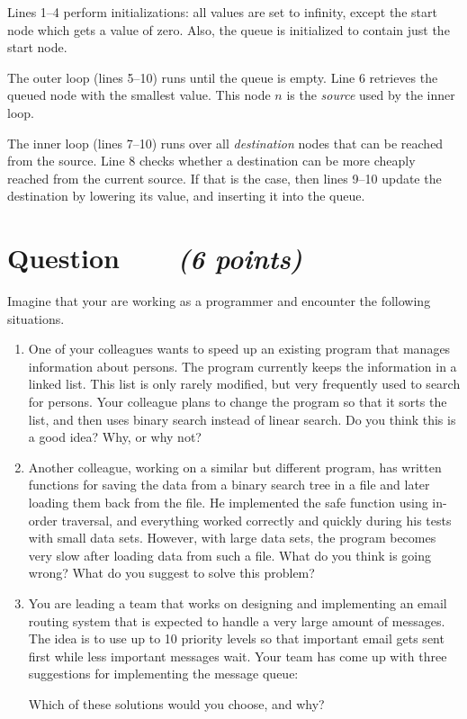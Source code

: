 \documentclass[a4paper]{article}
\newcounter{question}
\newcommand{\question}[1]{\refstepcounter{question}\section*{Question~\thequestion~~~\small\emph{(#1)}}}
\renewcommand*\thequestion{\arabic{question}}
\begin{document}
Lines 1--4 perform initializations: all values are set to infinity, except the start node which gets a value of zero.
Also, the queue is initialized to contain just the start node.

The outer loop (lines 5--10) runs until the queue is empty.
Line 6 retrieves the queued node with the smallest value.
This node $n$ is the \emph{source} used by the inner loop.

The inner loop (lines 7--10) runs over all \emph{destination} nodes that can be reached from the source.
Line 8 checks whether a destination can be more cheaply reached from the current source.
If that is the case, then lines 9--10 update the destination by lowering its value, and inserting it into the queue.



\clearpage

\question{6 points}

Imagine that your are working as a programmer and encounter the following situations.

\begin{enumerate}
\item
  One of your colleagues wants to speed up an existing program that manages information about persons.
  The program currently keeps the information in a linked list.
  This list is only rarely modified, but very frequently used to search for persons.
  Your colleague plans to change the program so that it sorts the list, and then uses binary search instead of linear search.
  Do you think this is a good idea?
  Why, or why not?
\item
  Another colleague, working on a similar but different program, has written functions for saving the data from a binary search tree in a file and later loading them back from the file.
  He implemented the safe function using in-order traversal, and everything worked correctly and quickly during his tests with small data sets.
  However, with large data sets, the program becomes very slow after loading data from such a file.
  What do you think is going wrong?
  What do you suggest to solve this problem?
\item
  You are leading a team that works on designing and implementing an email routing system that is expected to handle a very large amount of messages.
  The idea is to use up to 10 priority levels so that important email gets sent first while less important messages wait.
  Your team has come up with three suggestions for implementing the message queue:
  Which of these solutions would you choose, and why?
\end{enumerate}
\end{document}
